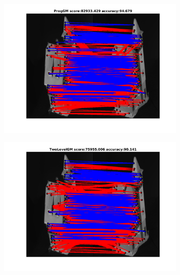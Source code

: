 \documentclass[
	fontsize=12pt,
	paper=a4,
	twoside=false,
	numbers=noenddot,
	plainheadsepline,
	toc=listof,
	toc=bibliography
]{scrartcl}
\begin{document}
\begin{figure}[h] 	
	\begin{subfigure}[b]{0.3\textwidth}
		\centering
		\includegraphics[scale=0.25]{"fig_ver2608/RealImages/House_seq/no_descr/using_cdf_afftrafo/ext_solution/fi_4_ProgGM"}  
	\end{subfigure}%
	\begin{subfigure}[b]{0.3\textwidth}
		\centering
		\includegraphics[scale=0.25]{"fig_ver2608/RealImages/House_seq/no_descr/using_cdf_afftrafo/ext_solution/fi_4_TwoLevelGM"}  
	\end{subfigure} 
	\begin{subfigure}[b]{0.3\textwidth}
		\centering

\end{subfigure}
\end{figure}
\end{document}
